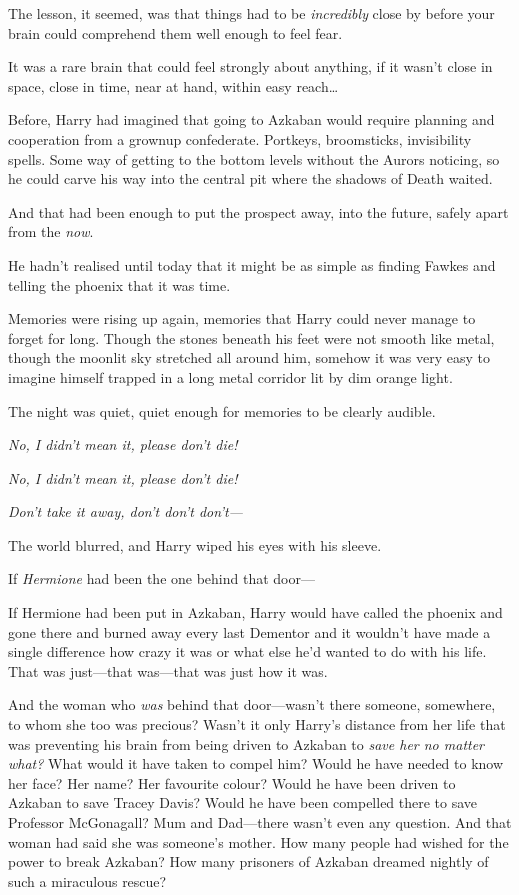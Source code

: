 The lesson, it seemed, was that things had to be \emph{incredibly} close
by before your brain could comprehend them well enough to feel fear.

It was a rare brain that could feel strongly about anything, if it
wasn't close in space, close in time, near at hand, within easy
reach\ldots{}

Before, Harry had imagined that going to Azkaban would require planning
and cooperation from a grownup confederate. Portkeys, broomsticks,
invisibility spells. Some way of getting to the bottom levels without
the Aurors noticing, so he could carve his way into the central pit
where the shadows of Death waited.

And that had been enough to put the prospect away, into the future,
safely apart from the \emph{now}.

He hadn't realised until today that it might be as simple as finding
Fawkes and telling the phoenix that it was time.

Memories were rising up again, memories that Harry could never manage to
forget for long. Though the stones beneath his feet were not smooth like
metal, though the moonlit sky stretched all around him, somehow it was
very easy to imagine himself trapped in a long metal corridor lit by dim
orange light.

The night was quiet, quiet enough for memories to be clearly audible.

\emph{No, I didn't mean it, please don't die!}

\emph{No, I didn't mean it, please don't die!}

\emph{Don't take it away, don't don't don't---}

The world blurred, and Harry wiped his eyes with his sleeve.

If \emph{Hermione} had been the one behind that door---

If Hermione had been put in Azkaban, Harry would have called the phoenix
and gone there and burned away every last Dementor and it wouldn't have
made a single difference how crazy it was or what else he'd wanted to do
with his life. That was just---that was---that was just how it was.

And the woman who \emph{was} behind that door---wasn't there someone,
somewhere, to whom she too was precious? Wasn't it only Harry's distance
from her life that was preventing his brain from being driven to Azkaban
to \emph{save her no matter what?} What would it have taken to compel
him? Would he have needed to know her face? Her name? Her favourite
colour? Would he have been driven to Azkaban to save Tracey Davis? Would
he have been compelled there to save Professor McGonagall? Mum and
Dad---there wasn't even any question. And that woman had said she was
someone's mother. How many people had wished for the power to break
Azkaban? How many prisoners of Azkaban dreamed nightly of such a
miraculous rescue?


